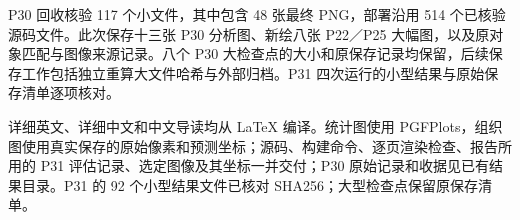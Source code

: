 \documentclass[
  11pt,
  fontset=fandol]{ctexart}
\begin{document}
P30 回收核验 117 个小文件，其中包含 48 张最终 PNG，部署沿用 514
个已核验源码文件。此次保存十三张 P30 分析图、新绘八张 P22／P25
大幅图，以及原对象匹配与图像来源记录。八个 P30
大检查点的大小和原保存记录均保留，后续保存工作包括独立重算大文件哈希与外部归档。P31
四次运行的小型结果与原始保存清单逐项核对。

详细英文、详细中文和中文导读均从 LaTeX 编译。统计图使用
PGFPlots，组织图使用真实保存的原始像素和预测坐标；源码、构建命令、逐页渲染检查、报告所用的
P31 评估记录、选定图像及其坐标一并交付；P30
原始记录和收据见已有结果目录。P31 的 92 个小型结果文件已核对
SHA256；大型检查点保留原保存清单。
\end{document}
